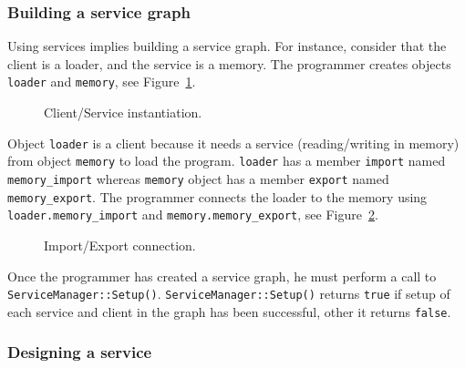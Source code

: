 \subsubsection{Building a service graph}
\label{tms320c3x_building_a_service_graph}

Using services implies building a service graph.
For instance, consider that the client is a loader, and the service is a memory.
The programmer creates objects \texttt{loader} and \texttt{memory}, see Figure~\ref{fig:tms320c3x_service_instanciation}.

\begin{figure}[h]
  \begin{center}
    
    \caption{\label{fig:tms320c3x_service_instanciation} Client/Service instantiation.}
  \end{center}
\end{figure}

Object \texttt{loader} is a client because it needs a service (reading/writing in memory) from object \texttt{memory} to load the program.
\texttt{loader} has a member \texttt{import} named \texttt{memory\_import} whereas \texttt{memory} object has a member \texttt{export} named \texttt{memory\_export}.
The programmer connects the loader to the memory using \texttt{loader.memory\_import} and \texttt{memory.memory\_export}, see Figure~\ref{fig:tms320c3x_service_connection}.

\begin{figure}[h]
  \begin{center}
    
    \caption{\label{fig:tms320c3x_service_connection} Import/Export connection.}
  \end{center}
\end{figure}

Once \hfill the \hfill programmer \hfill has \hfill created \hfill a \hfill service \hfill graph, \hfill he \hfill must \hfill perform \hfill a \hfill call \hfill to \hfill \texttt{ServiceManager::Setup()}.
\texttt{ServiceManager::Setup()} returns \texttt{true} if setup of each service and client in the graph has been successful, other it returns \texttt{false}.

\subsubsection{Designing a service}

